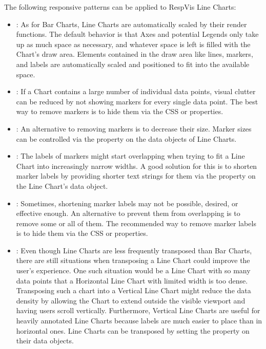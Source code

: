 The following responsive patterns can be applied to RespVis Line Charts:
\begin{itemize}
\item {}: As for Bar Charts, Line Charts are
  automatically scaled by their render functions. The default behavior
  is that Axes and potential Legends only take up as much space as
  necessary, and whatever space is left is filled with the Chart's
  draw area. Elements contained in the draw area like lines,
  markers, and labels are automatically scaled and positioned to fit
  into the available space.

\item {}: If a Chart contains a large number of
  individual data points, visual clutter can be reduced by not showing
  markers for every single data point. The best way to remove markers
  is to hide them via the CSS  or 
  properties.

\item {}: An alternative to removing markers is
  to decrease their size. Marker sizes can be controlled via the
   property on the data objects of Line Charts.

\item {}: The labels of markers might
  start overlapping when trying to fit a Line Chart into increasingly
  narrow widths. A good solution for this is to shorten marker labels
  by providing shorter text strings for them via the 
  property on the Line Chart's data object.

\item {}: Sometimes, shortening marker
  labels may not be possible, desired, or effective enough. An
  alternative to prevent them from overlapping is to remove some or
  all of them. The recommended way to remove marker labels is to hide
  them via the CSS  or  properties.

\item {}: Even though Line Charts are less
  frequently transposed than Bar Charts, there are still situations
  when transposing a Line Chart could improve the user's experience.
  One such situation would be a Line Chart with so many data points
  that a Horizontal Line Chart with limited width is too
  dense. Transposing such a chart into a Vertical Line Chart might
  reduce the data density by allowing the Chart to extend outside the
  visible viewport and having users scroll vertically. Furthermore,
  Vertical Line Charts are useful for heavily annotated Line Charts
  because labels are much easier to place than in horizontal
  ones. Line Charts can be transposed by setting the 
  property on their data objects.


\end{itemize}
